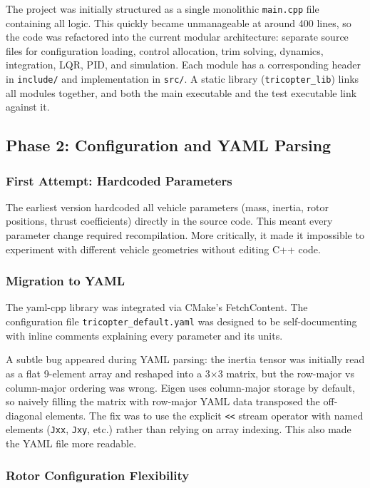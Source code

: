 \documentclass[12pt, a4paper]{article}
\begin{document}
The project was initially structured as a single monolithic \texttt{main.cpp} file containing all logic.  This quickly became unmanageable at around 400 lines, so the code was refactored into the current modular architecture: separate source files for configuration loading, control allocation, trim solving, dynamics, integration, LQR, PID, and simulation.  Each module has a corresponding header in \texttt{include/} and implementation in \texttt{src/}.  A static library (\texttt{tricopter\_lib}) links all modules together, and both the main executable and the test executable link against it.

\subsection{Phase 2: Configuration and YAML Parsing}

\subsubsection{First Attempt: Hardcoded Parameters}

The earliest version hardcoded all vehicle parameters (mass, inertia, rotor positions, thrust coefficients) directly in the source code.  This meant every parameter change required recompilation.  More critically, it made it impossible to experiment with different vehicle geometries without editing C++ code.

\subsubsection{Migration to YAML}

The yaml-cpp library was integrated via CMake's FetchContent.  The configuration file \texttt{tricopter\_default.yaml} was designed to be self-documenting with inline comments explaining every parameter and its units.

A subtle bug appeared during YAML parsing: the inertia tensor was initially read as a flat 9-element array and reshaped into a 3$\times$3 matrix, but the row-major vs column-major ordering was wrong.  Eigen uses column-major storage by default, so naively filling the matrix with row-major YAML data transposed the off-diagonal elements.  The fix was to use the explicit \texttt{<<} stream operator with named elements (\texttt{Jxx}, \texttt{Jxy}, etc.) rather than relying on array indexing.  This also made the YAML file more readable.

\subsubsection{Rotor Configuration Flexibility}
\end{document}
